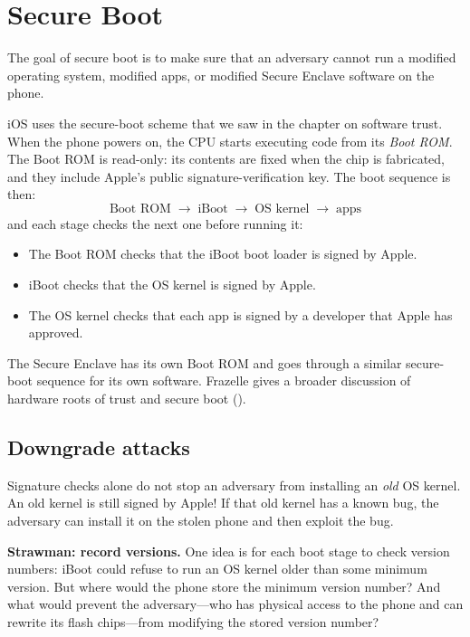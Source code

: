 \documentclass[
  letterpaper,
]{scrbook}
\providecommand{\tightlist}{%
  \setlength{\itemsep}{0pt}\setlength{\parskip}{0pt}}
\theoremstyle{definition}
\theoremstyle{plain}
\theoremstyle{plain}
\theoremstyle{remark}
\begin{document}
\section{Secure Boot}\label{sec-ios-boot}

The goal of secure boot is to make sure that an adversary cannot run a
modified operating system, modified apps, or modified Secure Enclave
software on the phone.

iOS uses the secure-boot scheme that we saw in the chapter on software
trust. When the phone powers on, the CPU starts executing code from its
\emph{Boot ROM}. The Boot ROM is read-only: its contents are fixed when
the chip is fabricated, and they include Apple's public
signature-verification key. The boot sequence is then: \[
  \text{Boot ROM} \;\to\; \text{iBoot} \;\to\; \text{OS kernel} \;\to\; \text{apps}
\] and each stage checks the next one before running it:

\begin{itemize}
\tightlist
\item
  The Boot ROM checks that the iBoot boot loader is signed by Apple.
\item
  iBoot checks that the OS kernel is signed by Apple.
\item
  The OS kernel checks that each app is signed by a developer that Apple
  has approved.
\end{itemize}

The Secure Enclave has its own Boot ROM and goes through a similar
secure-boot sequence for its own software. Frazelle gives a broader
discussion of hardware roots of trust and secure boot
().

\subsection{Downgrade attacks}\label{downgrade-attacks}

Signature checks alone do not stop an adversary from installing an
\emph{old} OS kernel. An old kernel is still signed by Apple! If that
old kernel has a known bug, the adversary can install it on the stolen
phone and then exploit the bug.

\textbf{Strawman: record versions.} One idea is for each boot stage to
check version numbers: iBoot could refuse to run an OS kernel older than
some minimum version. But where would the phone store the minimum
version number? And what would prevent the adversary---who has physical
access to the phone and can rewrite its flash chips---from modifying the
stored version number?
\end{document}
